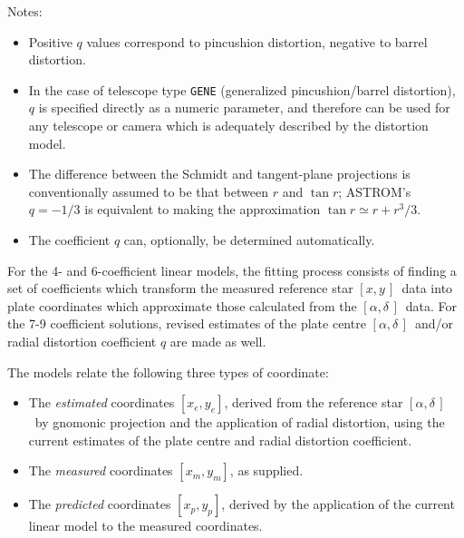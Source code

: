 \documentclass[twoside,11pt]{article}
\renewcommand{\_}{\texttt{\symbol{95}}}
\newcommand{\radec}     {$[\alpha,\delta\,]$}
\newcommand{\xy}        {$[x,y\,]$}
\begin{document}
\goodbreak
Notes:
\begin{itemize}

\item Positive $q$ values correspond to pincushion distortion,
   negative to barrel distortion.

\item In the case of telescope type \texttt{GENE}
   (generalized pincushion/barrel distortion), $q$ is specified directly
   as a numeric parameter, and therefore can be used for any telescope
   or camera which is adequately described by the distortion model.

\item The difference between the Schmidt and tangent-plane
   projections is conventionally assumed to be that between $r$ and $\tan
   r$; ASTROM's $q = -1/3$ is equivalent to making the approximation
   $\tan r \simeq r + r^3/3$.

\item The coefficient $q$ can, optionally, be determined automatically.

\end{itemize}

For the 4- and 6-coefficient linear models, the fitting process
consists of finding a set of coefficients which transform
the measured reference star \xy\ data into plate coordinates
which approximate those calculated from the \radec\ data.
For the 7-9 coefficient solutions, revised estimates of
the plate centre \radec\ and/or radial distortion
coefficient $q$ are made as well.

The models relate the following three types of coordinate:

\begin{itemize}

\item The \textit{estimated} coordinates $[x_{e},y_{e}]$, derived
   from the reference star \radec\ by gnomonic projection and the
   application of radial distortion, using the current estimates of the
   plate centre and radial distortion coefficient.

\item The \textit{measured} coordinates $[x_{m},y_{m}]$, as supplied.

\item The \textit{predicted} coordinates $[x_{p},y_{p}]$, derived by the
   application of the current linear model to the measured coordinates.

\end{itemize}
\end{document}
